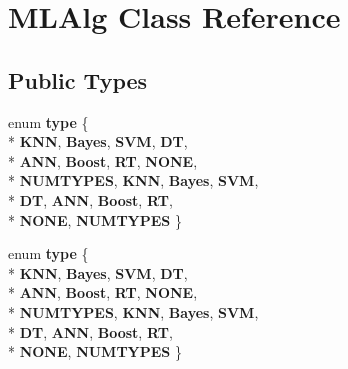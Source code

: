 \hypertarget{class_m_l_alg}{\section{M\-L\-Alg Class Reference}
\label{class_m_l_alg}
}
\subsection*{Public Types}
\begin{DoxyCompactItemize}
\item 
enum {\bfseries type} \{ \\*
{\bfseries K\-N\-N}, 
{\bfseries Bayes}, 
{\bfseries S\-V\-M}, 
{\bfseries D\-T}, 
\\*
{\bfseries A\-N\-N}, 
{\bfseries Boost}, 
{\bfseries R\-T}, 
{\bfseries N\-O\-N\-E}, 
\\*
{\bfseries N\-U\-M\-T\-Y\-P\-E\-S}, 
{\bfseries K\-N\-N}, 
{\bfseries Bayes}, 
{\bfseries S\-V\-M}, 
\\*
{\bfseries D\-T}, 
{\bfseries A\-N\-N}, 
{\bfseries Boost}, 
{\bfseries R\-T}, 
\\*
{\bfseries N\-O\-N\-E}, 
{\bfseries N\-U\-M\-T\-Y\-P\-E\-S}
 \}
\item 
enum {\bfseries type} \{ \\*
{\bfseries K\-N\-N}, 
{\bfseries Bayes}, 
{\bfseries S\-V\-M}, 
{\bfseries D\-T}, 
\\*
{\bfseries A\-N\-N}, 
{\bfseries Boost}, 
{\bfseries R\-T}, 
{\bfseries N\-O\-N\-E}, 
\\*
{\bfseries N\-U\-M\-T\-Y\-P\-E\-S}, 
{\bfseries K\-N\-N}, 
{\bfseries Bayes}, 
{\bfseries S\-V\-M}, 
\\*
{\bfseries D\-T}, 
{\bfseries A\-N\-N}, 
{\bfseries Boost}, 
{\bfseries R\-T}, 
\\*
{\bfseries N\-O\-N\-E}, 
{\bfseries N\-U\-M\-T\-Y\-P\-E\-S}
 \}
\end{DoxyCompactItemize}
